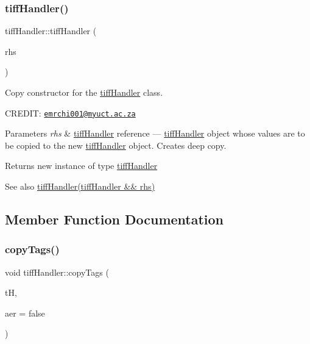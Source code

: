 \subsubsection{\texorpdfstring{tiff\+Handler()}{tiffHandler()}\hspace{0.1cm}{\footnotesize\ttfamily [5/5]}}
{\footnotesize\ttfamily tiff\+Handler\+::tiff\+Handler (\begin{DoxyParamCaption}\item[{const \hyperlink{classtiffHandler}{tiff\+Handler} \&}]{rhs }\end{DoxyParamCaption})}



Copy constructor for the \hyperlink{classtiffHandler}{tiff\+Handler} class. 

C\+R\+E\+D\+IT\+: \href{mailto:emrchi001@myuct.ac.za}{\tt emrchi001@myuct.\+ac.\+za}


\begin{DoxyParams}{Parameters}
{\em rhs} & \hyperlink{classtiffHandler}{tiff\+Handler} reference --- \hyperlink{classtiffHandler}{tiff\+Handler} object whose values are to be copied to the new \hyperlink{classtiffHandler}{tiff\+Handler} object. Creates deep copy.\\
\hline
\end{DoxyParams}
\begin{DoxyReturn}{Returns}
new instance of type \hyperlink{classtiffHandler}{tiff\+Handler}
\end{DoxyReturn}
\begin{DoxySeeAlso}{See also}
\hyperlink{classtiffHandler_a7bfe3d9b0553461580dcfb8467ec9d6d}{tiff\+Handler(tiff\+Handler \&\& rhs)} 
\end{DoxySeeAlso}


\subsection{Member Function Documentation}
\mbox{\label{classtiffHandler_a2a813af9ec1e322fafc0d5e0a3593cbc}} 
\subsubsection{\texorpdfstring{copy\+Tags()}{copyTags()}}
{\footnotesize\ttfamily void tiff\+Handler\+::copy\+Tags (\begin{DoxyParamCaption}\item[{const \hyperlink{classtiffHandler}{tiff\+Handler} \&}]{tH,  }\item[{bool}]{aer = {\ttfamily false} }\end{DoxyParamCaption})}



